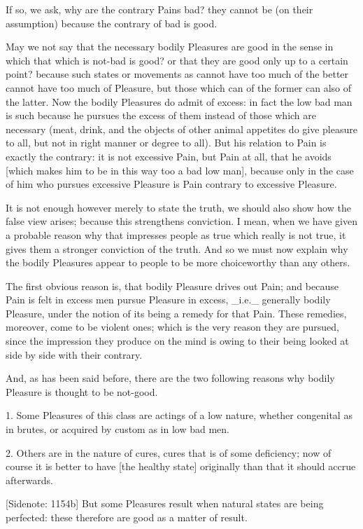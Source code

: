 If so, we ask, why are the contrary Pains bad? they cannot be (on their
assumption) because the contrary of bad is good.

May we not say that the necessary bodily Pleasures are good in the sense
in which that which is not-bad is good? or that they are good only up
to a certain point? because such states or movements as cannot have too
much of the better cannot have too much of Pleasure, but those which can
of the former can also of the latter. Now the bodily Pleasures do admit
of excess: in fact the low bad man is such because he pursues the excess
of them instead of those which are necessary (meat, drink, and the
objects of other animal appetites do give pleasure to all, but not in
right manner or degree to all). But his relation to Pain is exactly the
contrary: it is not excessive Pain, but Pain at all, that he avoids
[which makes him to be in this way too a bad low man], because only
in the case of him who pursues excessive Pleasure is Pain contrary to
excessive Pleasure.

It is not enough however merely to state the truth, we should also show
how the false view arises; because this strengthens conviction. I mean,
when we have given a probable reason why that impresses people as true
which really is not true, it gives them a stronger conviction of the
truth. And so we must now explain why the bodily Pleasures appear to
people to be more choiceworthy than any others.

The first obvious reason is, that bodily Pleasure drives out Pain; and
because Pain is felt in excess men pursue Pleasure in excess, _i.e._
generally bodily Pleasure, under the notion of its being a remedy for
that Pain. These remedies, moreover, come to be violent ones; which is
the very reason they are pursued, since the impression they produce
on the mind is owing to their being looked at side by side with their
contrary.

And, as has been said before, there are the two following reasons why
bodily Pleasure is thought to be not-good.

1. Some Pleasures of this class are actings of a low nature, whether
congenital as in brutes, or acquired by custom as in low bad men.

2. Others are in the nature of cures, cures that is of some deficiency;
now of course it is better to have [the healthy state] originally than
that it should accrue afterwards.

[Sidenote: 1154b] But some Pleasures result when natural states are
being perfected: these therefore are good as a matter of result.


